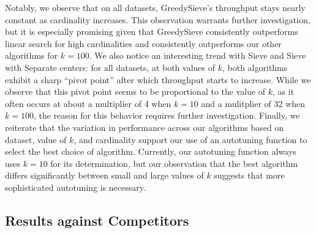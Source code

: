 Notably, we observe that on all datasets, GreedySieve's throughput stays nearly constant as cardinality increases. This observation warrants further investigation, but it is especially promising given that GreedySieve consistently outperforms linear search for high cardinalities and consistently outperforms our other algorithms for $k=100$. 
We also notice an interesting trend with Sieve and Sieve with Separate centers: for all datasets, at both values of $k$, both algorithms exhibit a sharp ``pivot point'' after which throughput starts to increase. 
While we observe that this pivot point seems to be proportional to the value of $k$, as it often occurs at about a multiplier of 4 when $k=10$ and a mulitplier of 32 when $k=100$, the reason for this behavior requires further investigation.  
Finally, we reiterate that the variation in performance across our algorithms based on dataset, value of $k$, and cardinality support our use of an autotuning function to select the best choice of algorithm. 
Currently, our autotuning function always uses $k=10$ for its determination, but our observation that the best algorithm differs significantly between small and large values of $k$ suggests that more sophisticated autotuning is necessary.


\subsection{Results against Competitors}




